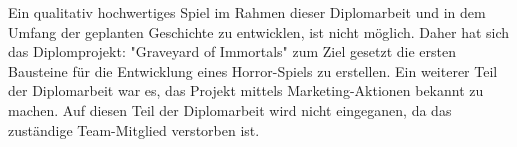 Ein qualitativ hochwertiges Spiel im Rahmen dieser Diplomarbeit und in dem Umfang der geplanten Geschichte
zu entwicklen, ist nicht möglich.
Daher hat sich das Diplomprojekt: "Graveyard of Immortals" zum Ziel gesetzt die ersten Bausteine für die Entwicklung
eines Horror-Spiels zu erstellen.
Ein weiterer Teil der Diplomarbeit war es, das Projekt mittels Marketing-Aktionen bekannt zu machen.
Auf diesen Teil der Diplomarbeit wird nicht eingeganen, da das zuständige Team-Mitglied verstorben ist.
